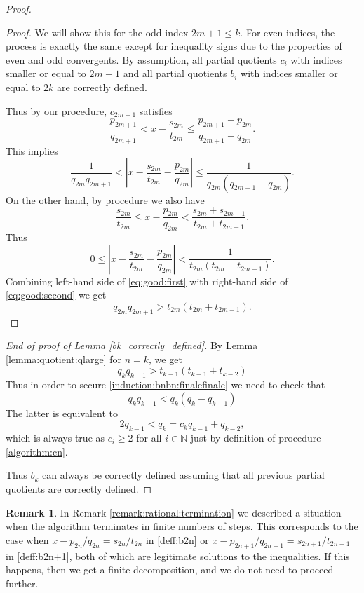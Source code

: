 \documentclass{amsart}
\theoremstyle{definition}
\newtheorem{remark}[theorem]{Remark}
\newcommand{\N}{\mathbb N}%
\newcommand{\0}{\mbf 0}%
\def\N{\mathbb N}
\begin{document}
\begin{proof}
\begin{proof}
We will show this for the odd index $2m+1\leq k$. For even indices, the process is exactly the same except for inequality signs due to the properties of even and odd convergents. By assumption, all partial quotients $c_i$ with indices smaller or equal to $2m+1$ and all partial quotients $b_i$ with indices smaller or equal to $2k$ are correctly defined.

Thus by our procedure, $c_{2m+1}$ satisfies
$$
\frac{p_{2m+1}}{q_{2m+1}}  < x - \frac{s_{2m}}{t_{2m}}   \leq \frac{p_{2m+1}-p_{2m}}{q_{2m+1}-q_{2m}}.
$$
This implies
\begin{equation}\label{eq:good:first}
\frac{1}{q_{2m}q_{2m+1}}  < \left| x - \frac{s_{2m}}{t_{2m}} - \frac{p_{2m}}{q_{2m}} \right| \leq \frac{1}{q_{2m}(q_{2m+1}-q_{2m})}.
\end{equation}
On the other hand, by procedure we also have
$$
\frac{s_{2m}}{t_{2m}} \leq x- \frac{p_{2m}}{q_{2m}} < \frac{s_{2m}+s_{2m-1}}{t_{2m}+t_{2m-1}}.
$$
Thus
\begin{equation}\label{eq:good:second}
0 \leq \left| x - \frac{s_{2m}}{t_{2m}} - \frac{p_{2m}}{q_{2m}} \right| < \frac{1}{t_{2m}(t_{2m}+t_{2m-1})}.
\end{equation}
Combining left-hand side of \eqref{eq:good:first} with right-hand side of \eqref{eq:good:second} we get
$$
q_{2m}q_{2m+1} > t_{2m}(t_{2m}+t_{2m-1}).
$$
\end{proof}

\noindent
\textit{End of proof of Lemma \ref{bk_correctly_defined}. }
By Lemma \ref{lemma:quotient:qlarge} for $n=k$, we get
$$
q_{k}q_{k-1} > t_{k-1} (t_{k-1}+t_{k-2})
$$
Thus in order to secure \eqref{induction:bnbn:finalefinale} we need to check that
$$
q_{k}q_{k-1} < q_k(q_k-q_{k-1})
$$
The latter is equivalent to 
$$
2 q_{k-1} < q_{k}=c_{k} q_{k-1} + q_{k-2},
$$
which is always true as $c_i\geq2$ for all $i\in\N$ just by definition of procedure \eqref{algorithm:cn}.

Thus $b_k$ can always be correctly defined assuming that all previous partial quotients are correctly defined. 
\end{proof}


\begin{remark}\label{remark:termination:exp1}
In Remark \ref{remark:rational:termination} we described a situation when the algorithm terminates in finite numbers of steps. This corresponds to the case when $x-p_{2n}/q_{2n}=s_{2n}/t_{2n}$ in \eqref{deff:b2n} or $x-p_{2n+1}/q_{2n+1}=s_{2n+1}/t_{2n+1}$ in \eqref{deff:b2n+1}, both of which are legitimate solutions to the inequalities. If this happens, then we get a finite decomposition, and we do not need to proceed further.
\end{remark}
\end{document}
